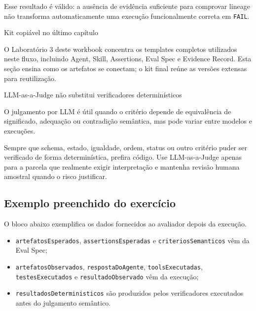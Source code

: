 \documentclass[
  10pt,
  a4paper,
  oneside]{book}
\providecommand{\tightlist}{%
  \setlength{\itemsep}{0pt}\setlength{\parskip}{0pt}}
\begin{document}
Esse resultado é válido: a ausência de evidência suficiente para
comprovar lineage não transforma automaticamente uma execução
funcionalmente correta em \texttt{FAIL}.

\begin{tipbox}{Kit copiável no último capítulo}

O Laboratório 3 deste workbook concentra os templates completos
utilizados neste fluxo, incluindo Agent, Skill, Assertions, Eval Spec e
Evidence Record. Esta seção ensina como os artefatos se conectam; o kit
final reúne as versões extensas para reutilização.

\end{tipbox}

\begin{warningbox}{LLM-as-a-Judge não substitui verificadores determinísticos}

O julgamento por LLM é útil quando o critério depende de equivalência de
significado, adequação ou contradição semântica, mas pode variar entre
modelos e execuções.

Sempre que schema, estado, igualdade, ordem, status ou outro critério
puder ser verificado de forma determinística, prefira código. Use
LLM-as-a-Judge apenas para a parcela que realmente exigir interpretação
e mantenha revisão humana amostral quando o risco justificar.

\end{warningbox}

\hypertarget{exemplo-preenchido-do-exercuxedcio}{%
\subsection{Exemplo preenchido do
exercício}\label{exemplo-preenchido-do-exercuxedcio}}

O bloco abaixo exemplifica os dados fornecidos ao avaliador depois da
execução.

\begin{itemize}
\tightlist
\item
  \texttt{artefatosEsperados}, \texttt{assertionsEsperadas} e
  \texttt{criteriosSemanticos} vêm da Eval Spec;
\item
  \texttt{artefatosObservados}, \texttt{respostaDoAgente},
  \texttt{toolsExecutadas}, \texttt{testesExecutados} e
  \texttt{resultadoObservado} vêm da execução;
\item
  \texttt{resultadosDeterministicos} são produzidos pelos verificadores
  executados antes do julgamento semântico.
\end{itemize}
\end{document}
